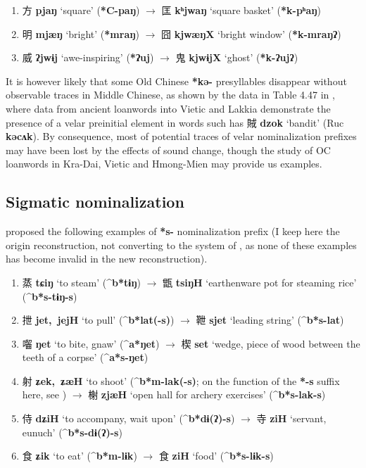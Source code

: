 \documentclass[oneside,a4paper,11pt]{article}
\newcommand{\ipa}[1]{\textbf{{\phon\mbox{#1}}}} %
\newcommand{\zh}[1]{{\cn #1}}
\newcommand{\zhc}[2]{\zh{#1} \ipa{#2}}
\begin{document}
\begin{enumerate}
\item \zhc{方}{pjaŋ} ‘square’ (\ipa{*C-paŋ})  $\rightarrow$ \zhc{匡}{kʰjwaŋ} ‘square basket’   (\ipa{*k-pʰaŋ})
\item \zhc{明}{mjæŋ} ‘bright’ (\ipa{*mraŋ})  $\rightarrow$ \zhc{囧}{kjwæŋX} ‘bright window’   (\ipa{*k-mraŋʔ})
\item \zhc{威}{ʔjwɨj} ‘awe-inspiring’ (\ipa{*ʔuj})  $\rightarrow$ \zhc{鬼}{kjwɨjX} ‘ghost’   (\ipa{*k-ʔujʔ})
\end{enumerate}

It is however likely that some Old Chinese \ipa{*kə-} presyllables disappear without observable traces in Middle Chinese, as shown by the data in Table 4.47 in \citet[153]{bs14oc}, where data from ancient loanwords into Vietic and Lakkia demonstrate the presence of a velar preinitial element in words such has \zhc{賊}{dzok} `bandit' (Ruc \ipa{kəcʌk}). By consequence, most of potential traces of velar nominalization prefixes may have been lost by the effects of sound change, though the study of OC loanwords in Kra-Dai, Vietic and Hmong-Mien may provide us examples.

\subsection{Sigmatic nominalization}
\citet[73]{sagart99roc} proposed the following examples of \ipa{*s-} nominalization prefix (I keep here the origin reconstruction, not converting to the system of \citealt{bs14oc}, as none of these examples has become invalid in the new reconstruction).

\begin{enumerate}
\item \zhc{蒸}{tɕiŋ} `to steam' (\ipa{^b*tɨŋ}) $\rightarrow$ \zhc{甑}{tsiŋH} `earthenware pot for steaming rice' (\ipa{^b*s-tɨŋ-s})
\item \zhc{抴}{jet, jejH} `to pull' (\ipa{^b*lat(-s)}) $\rightarrow$ \zhc{靾}{sjet} `leading string' (\ipa{^b*s-lat})
\item \zhc{囓}{ŋet} `to bite, gnaw' (\ipa{^a*ŋet}) $\rightarrow$ \zhc{楔}{set} `wedge, piece of wood between the teeth of a corpse' (\ipa{^a*s-ŋet})
\item \zhc{射}{ʑek, ʑæH} `to shoot' (\ipa{^b*m-lak(-s)}; on the function of the \ipa{*-s} suffix here, see \citealt{jacques18antipass}) $\rightarrow$ \zhc{榭}{zjæH} `open hall for archery exercises' (\ipa{^b*s-lak-s}) 
\item \zhc{侍}{dʑiH} `to accompany, wait upon' (\ipa{^b*dɨ(ʔ)-s}) $\rightarrow$ \zhc{寺}{ziH} `servant, eunuch' (\ipa{^b*s-dɨ(ʔ)-s})
\item \zhc{食}{ʑik} `to eat' (\ipa{^b*m-lɨk}) $\rightarrow$ \zhc{食}{ziH} `food' (\ipa{^b*s-lɨk-s})
\end{enumerate}
\end{document}
